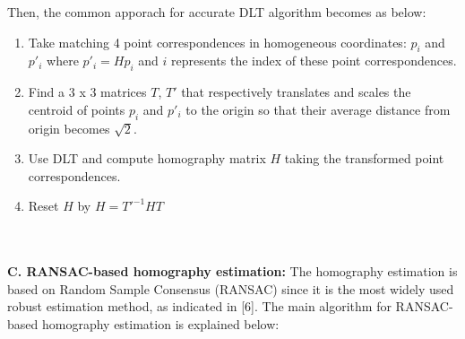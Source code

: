 \documentclass{article}
\begin{document}
Then, the common apporach for accurate DLT algorithm becomes as below:
\begin{enumerate}
\item Take matching 4 point correspondences in homogeneous coordinates: $p_{i}$ and $p'_{i}$ where $p'_{i} = Hp_{i}$ and $i$ represents the index of these point correspondences.
\item Find a 3 x 3  matrices $T$, $T'$ that respectively translates and scales the centroid of points $p_{i}$ and $p'_{i}$ to the origin so that their average distance from origin becomes $\sqrt{2}$.
\item Use DLT and compute homography matrix $H$ taking the transformed point correspondences.
\item Reset $H$ by $H = T'^{-1} H T$
\end{enumerate}
\ \\~\\
\textbf{C. RANSAC-based homography estimation:}
The homography estimation is based on Random Sample Consensus (RANSAC) since it is the most widely used robust estimation method, as indicated in [6]. The main algorithm for RANSAC-based homography estimation is explained below:
\end{document}
